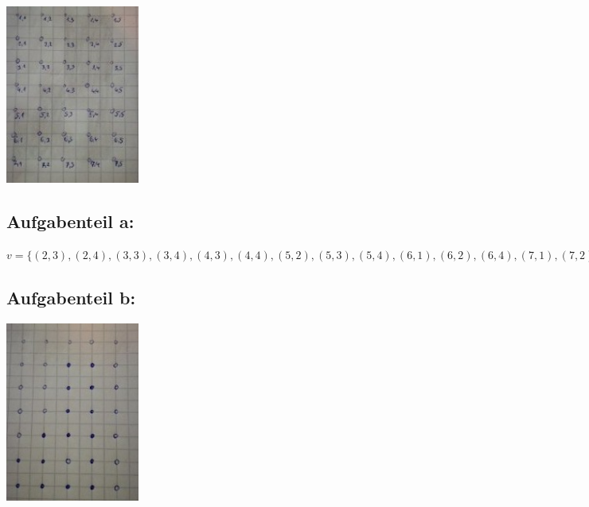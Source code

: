 
\includegraphics[width=0.33\textwidth]{1a.jpeg}


\subsection*{Aufgabenteil a:}
$v=\{(2,3),(2,4),(3,3),(3,4),(4,3),(4,4),(5,2),(5,3),(5,4),(6,1),(6,2),(6,4),(7,1),(7,2),(7,3),(7,4)\}$

\subsection*{Aufgabenteil b:}

\includegraphics[width=0.33\textwidth, angle=90]{1b.jpeg}